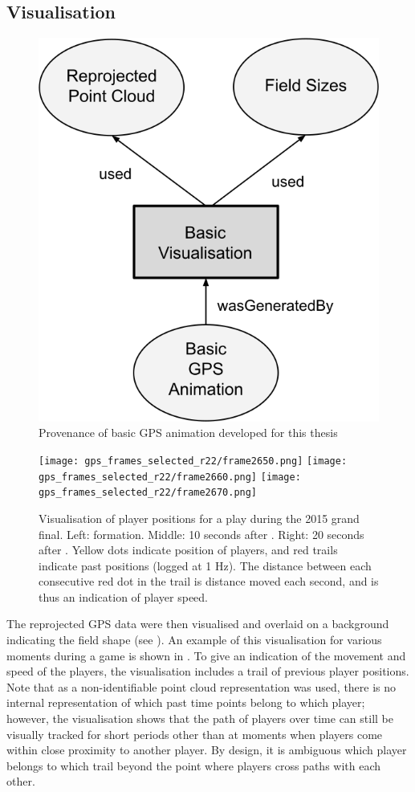 \subsection{Visualisation} \label{sec:integration-vis}

\begin{figure}[H]
\centering
\includegraphics[width=0.45\linewidth]{figs/prov/prov-4.png}
\caption{Provenance of basic GPS animation developed for this thesis \notationdetails{}
\label{fig:prov4}}
\end{figure}

\begin{figure}[htbp]
\centering
\texttt{[image: gps\_frames\_selected\_r22/frame2650.png]}
\texttt{[image: gps\_frames\_selected\_r22/frame2660.png]}
\texttt{[image: gps\_frames\_selected\_r22/frame2670.png]}
\caption{Visualisation of player positions for a play during the 2015 grand final. Left: \centrebounce{} formation. Middle: 10 seconds after \centrebounce{}. Right: 20 seconds after \centrebounce{}. Yellow dots indicate position of players, and red trails indicate past positions (logged at 1 Hz). The distance between each consecutive red dot in the trail is distance moved each second, and is thus an indication of player speed.}
\label{fig:gps-frames-selected}
\end{figure}

The reprojected GPS data were then visualised and overlaid on a background indicating the field shape (see ). An example of this visualisation for various moments during a game is shown in . To give an indication of the movement and speed of the players, the visualisation includes a trail of previous player positions. Note that as a non-identifiable point cloud representation was used, there is no internal representation of which past time points belong to which player; however, the visualisation shows that the path of players over time can still be visually tracked for short periods other than at moments when players come within close proximity to another player. By design, it is ambiguous which player belongs to which trail beyond the point where players cross paths with each other.

